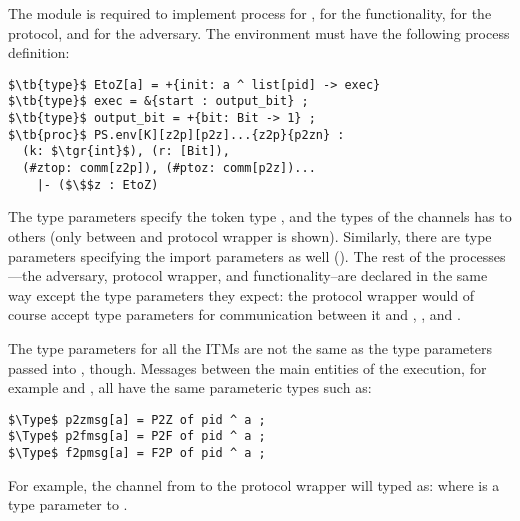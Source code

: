 The module  is required to implement process  for \Z,  for the functionality,  for the protocol, and  for the adversary.
The environment  must have the following process definition:
\begin{lstlisting}[basicstyle=\small\BeraMonottFamily, mathescape, frame=single]
$\tb{type}$ EtoZ[a] = +{init: a ^ list[pid] -> exec} 
$\tb{type}$ exec = &{start : output_bit} ;
$\tb{type}$ output_bit = +{bit: Bit -> 1} ;
$\tb{proc}$ PS.env[K][z2p][p2z]...{z2p}{p2zn} : 
  (k: $\tgr{int}$), (r: [Bit]), 
  (#ztop: comm[z2p]), (#ptoz: comm[p2z])...
    |- ($\$$z : EtoZ)
\end{lstlisting}

The type parameters specify the token type , and the types of the channels \Z has to others (only between \Z and protocol wrapper is shown). Similarly, there are type parameters specifying the import parameters as well ().
The rest of the processes---the adversary, protocol wrapper, and functionality--are declared in the same way except the type parameters they expect: the protocol wrapper would of course accept type parameters for communication between it and \F, \A, and \Z.

The type parameters for all the ITMs are not the same as the type parameters passed into , though. 
Messages between the main entities of the execution, for example \Z and \A, all have the same parameteric types such as:
\begin{lstlisting}[basicstyle=\small\BeraMonottFamily, frame=single, mathescape]
$\Type$ p2zmsg[a] = P2Z of pid ^ a ;
$\Type$ p2fmsg[a] = P2F of pid ^ a ;
$\Type$ f2pmsg[a] = F2P of pid ^ a ;
\end{lstlisting}
For example, the channel from \Z to the protocol wrapper will typed as:  where  is a type parameter to .



